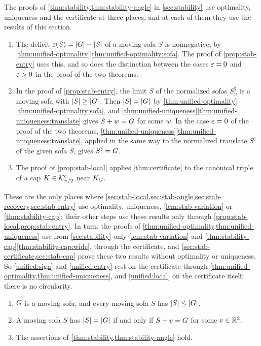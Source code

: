 The proofs of \cref{thm:stability,thm:stability-angle} in \cref{sec:stability}
use optimality, uniqueness and the certificate at three places, and at each of
them they use the results of this section.
\begin{enumerate}[label=(\Alph*)]
\item\label{unified:sign} The deficit $\varepsilon(S)=\lvert G\rvert-\lvert S\rvert$ of a moving sofa
$S$ is nonnegative, by
\cref{thm:unified-optimality}\ref{thm:unified-optimality:sofa}. The proof of
\cref{prop:stab-entry} uses this, and so does the distinction between the cases
$\varepsilon=0$ and $\varepsilon>0$ in the proof of the two theorems.
\item\label{unified:entry} In the proof of \cref{prop:stab-entry}, the limit $S$
of the normalized sofas $S_n^\natural$ is a moving sofa with
$\lvert S\rvert\ge\lvert G\rvert$. Then $\lvert S\rvert=\lvert G\rvert$ by
\cref{thm:unified-optimality}\ref{thm:unified-optimality:sofa}, and
\cref{thm:unified-uniqueness}\ref{thm:unified-uniqueness:translate} gives
$S+w=G$ for some $w$. In the case $\varepsilon=0$ of the proof of the two theorems,
\cref{thm:unified-uniqueness}\ref{thm:unified-uniqueness:translate}, applied in
the same way to the normalized translate $S^\natural$ of the given sofa $S$,
gives $S^\natural=G$.
\item\label{unified:local} The proof of \cref{prop:stab-local} applies
\cref{thm:certificate} to the canonical triple of a cap $K\in\mathcal{K}^{\mathrm{c}}_{\pi/2}$ near
$K_G$.
\end{enumerate}
These are the only places where
\cref{sec:stab-local,sec:stab-angle,sec:stab-recovery,sec:stab-entry} use
optimality, uniqueness, \cref{lem:stab-variation} or \cref{thm:stability-cap};
their other steps use these results only through
\cref{prop:stab-local,prop:stab-entry}. In turn, the proofs of
\cref{thm:unified-optimality,thm:unified-uniqueness} use from
\cref{sec:stability} only \cref{lem:stab-variation} and
\cref{thm:stability-cap}\ref{thm:stability-cap:wide}, through the certificate,
and \cref{sec:stab-certificate,sec:stab-cap} prove these two results without
optimality or uniqueness. So \ref{unified:sign} and \ref{unified:entry} rest
on the certificate through \cref{thm:unified-optimality,thm:unified-uniqueness},
and \ref{unified:local} on the certificate itself; there is no circularity.

\begin{theorem}\label{thm:unified}
\begin{enumerate}[label=(\alph*)]
\item\label{thm:unified:opt} $G$ is a moving sofa, and every moving sofa $S$
has $\lvert S\rvert\le\lvert G\rvert$.
\item\label{thm:unified:unique} A moving sofa $S$ has $\lvert S\rvert=\lvert G\rvert$ if and
only if $S+v=G$ for some $v\in\mathbb{R}^2$.
\item\label{thm:unified:stable} The assertions of
\cref{thm:stability,thm:stability-angle} hold.
\end{enumerate}
\end{theorem}

